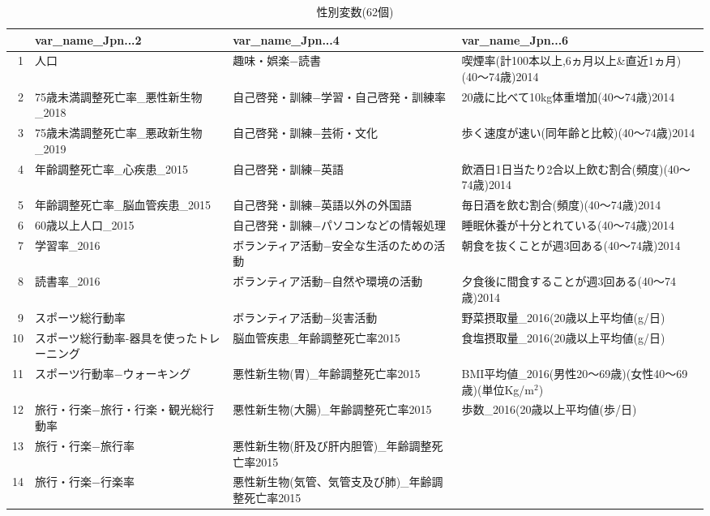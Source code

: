 \begin{table}[ht]
\centering
\caption{性別変数(62個)}
\label{table_mf_d.tex}
\begingroup\tiny

\begin{adjustbox}{width=1.5\textwidth}
\begin{tabular}{rlll}
  \hline
 & var\_name\_Jpn...2 & var\_name\_Jpn...4 & var\_name\_Jpn...6 \\
  \hline
1 & 人口 & 趣味・娯楽−読書 & 喫煙率(計100本以上,6ヵ月以上\&直近1ヵ月)(40〜74歳)2014 \\
  2 & 75歳未満調整死亡率\_悪性新生物\_2018 & 自己啓発・訓練−学習・自己啓発・訓練率 & 20歳に比べて10kg体重増加(40〜74歳)2014 \\
  3 & 75歳未満調整死亡率\_悪政新生物\_2019 & 自己啓発・訓練−芸術・文化 & 歩く速度が速い(同年齢と比較)(40〜74歳)2014 \\
  4 & 年齢調整死亡率\_心疾患\_2015 & 自己啓発・訓練−英語 & 飲酒日1日当たり2合以上飲む割合(頻度)(40〜74歳)2014 \\
  5 & 年齢調整死亡率\_脳血管疾患\_2015 & 自己啓発・訓練−英語以外の外国語 & 毎日酒を飲む割合(頻度)(40〜74歳)2014 \\
  6 & 60歳以上人口\_2015 & 自己啓発・訓練−パソコンなどの情報処理 & 睡眠休養が十分とれている(40〜74歳)2014 \\
  7 & 学習率\_2016 & ボランティア活動−安全な生活のための活動 & 朝食を抜くことが週3回ある(40〜74歳)2014 \\
  8 & 読書率\_2016 & ボランティア活動−自然や環境の活動 & 夕食後に間食することが週3回ある(40〜74歳)2014 \\
  9 & スポーツ総行動率 & ボランティア活動−災害活動 & 野菜摂取量\_2016(20歳以上平均値(g/日) \\
  10 & スポーツ総行動率-器具を使ったトレーニング & 脳血管疾患\_年齢調整死亡率2015 & 食塩摂取量\_2016(20歳以上平均値(g/日) \\
  11 & スポーツ行動率−ウォーキング & 悪性新生物(胃)\_年齢調整死亡率2015 & BMI平均値\_2016(男性20〜69歳)(女性40〜69歳)(単位Kg/m$^2$) \\
  12 & 旅行・行楽−旅行・行楽・観光総行動率 & 悪性新生物(大腸)\_年齢調整死亡率2015 & 歩数\_2016(20歳以上平均値(歩/日) \\
  13 & 旅行・行楽−旅行率 & 悪性新生物(肝及び肝内胆管)\_年齢調整死亡率2015 &  \\
  14 & 旅行・行楽−行楽率 & 悪性新生物(気管、気管支及び肺)\_年齢調整死亡率2015 &  \\

\end{tabular}
\end{adjustbox}
\end{table}
